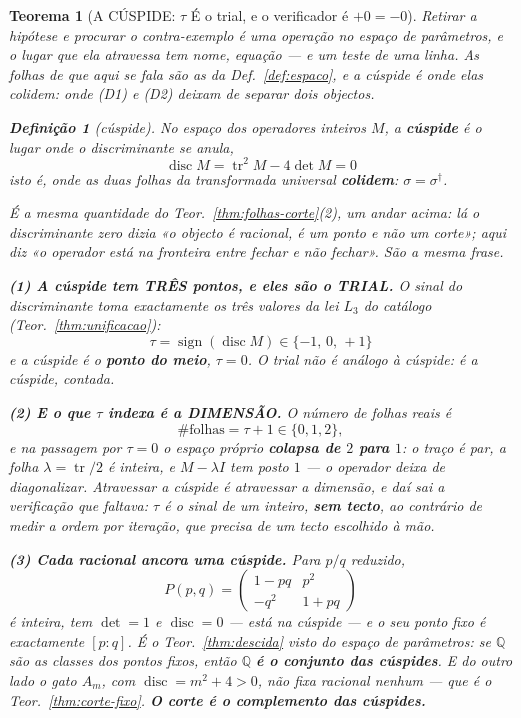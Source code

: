 \documentclass[11pt,a4paper]{article}
\newtheorem{teorema}{Teorema}
\newtheorem{definicao}{Definição}
\newcommand{\dg}{^{\dagger}}
\begin{document}
\begin{teorema}[A CÚSPIDE: $\tau$ É o trial, e o verificador é $+0=-0$]\label{thm:cuspide}
Retirar a hipótese e procurar o contra-exemplo é uma operação no \emph{espaço de
parâmetros}, e o lugar que ela atravessa tem nome, equação --- e um teste de uma linha. As
folhas de que aqui se fala são as da Def.~\ref{def:espaco}, e a cúspide é onde elas
colidem: onde (D1) e (D2) deixam de separar dois objectos.

\begin{definicao}[cúspide]\label{def:cuspide}
No espaço dos operadores inteiros $M$, a \textbf{cúspide} é o lugar onde o discriminante se
anula,
\[
\boxed{\;\operatorname{disc}M=\operatorname{tr}^{2}M-4\det M=0\;}
\]
isto é, onde as duas folhas da transformada universal \textbf{colidem}:
$\sigma=\sigma\dg$.
\end{definicao}

\noindent É a mesma quantidade do Teor.~\ref{thm:folhas-corte}(2), um andar acima: lá o
discriminante zero dizia \emph{«o objecto é racional, é um ponto e não um corte»}; aqui diz
\emph{«o operador está na fronteira entre fechar e não fechar»}. São a mesma frase.

\textbf{(1) A cúspide tem TRÊS pontos, e eles são o TRIAL.} O sinal do discriminante toma
exactamente os três valores da lei $L_3$ do catálogo (Teor.~\ref{thm:unificacao}):
\[
\boxed{\;\tau=\operatorname{sign}(\operatorname{disc}M)\in\{-1,\,0,\,+1\}\;}
\]
e a cúspide é o \textbf{ponto do meio}, $\tau=0$. \emph{O trial não é análogo à cúspide: é
a cúspide, contada.}

\textbf{(2) E o que $\tau$ indexa é a DIMENSÃO.} O número de folhas reais é
\[
\#\text{folhas}=\tau+1\in\{0,1,2\},
\]
e na passagem por $\tau=0$ o espaço próprio \textbf{colapsa de $2$ para $1$}: o traço é par,
a folha $\lambda=\operatorname{tr}/2$ é inteira, e $M-\lambda I$ tem posto $1$ --- o
operador deixa de diagonalizar. \emph{Atravessar a cúspide é atravessar a dimensão}, e daí
sai a verificação que faltava: $\tau$ é o sinal de um inteiro, \textbf{sem tecto}, ao
contrário de medir a ordem por iteração, que precisa de um tecto escolhido à mão.

\textbf{(3) Cada racional ancora uma cúspide.} Para $p/q$ reduzido,
\[
P(p,q)=\begin{pmatrix}1-pq & p^{2}\\ -q^{2} & 1+pq\end{pmatrix}
\]
é inteira, tem $\det=1$ e $\operatorname{disc}=0$ --- está na cúspide --- e o seu ponto fixo
é exactamente $[p:q]$. \emph{É o Teor.~\ref{thm:descida} visto do espaço de parâmetros}: se
$\mathbb{Q}$ são as classes dos pontos fixos, então $\mathbb{Q}$ \textbf{é o conjunto das
cúspides}. E do outro lado o gato $A_m$, com $\operatorname{disc}=m^{2}+4>0$, não fixa
racional nenhum --- que é o Teor.~\ref{thm:corte-fixo}. \textbf{O corte é o complemento das
cúspides.}


\end{teorema}
\end{document}
